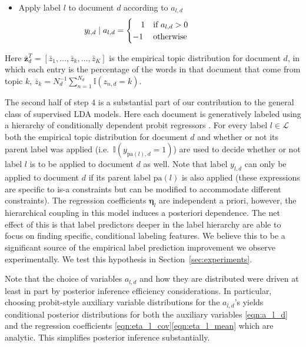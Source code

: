 \begin{enumerate}
\begin{itemize}
\begin{itemize}
\item Apply label $l$ to document $d$ according to $a_{l,d}$ \[\hspace{-2cm}
y_{l,d}\mid a_{l,d}=\begin{cases}
\ \ \ 1 & \text{if \ensuremath{a_{l,d}>0}} \\%
-1 & \text{otherwise}\end{cases}\]
 
\end{itemize}
\end{itemize}
\end{enumerate}


Here $\bar{\mathbf{z}}_d^T = [\bar{z}_{1}, \ldots, \bar{z}_k, \ldots, \bar{z}_K]$ is the empirical topic distribution for document $d$, in which each entry is the percentage of the words in that document that come from topic $k$, $\bar{z}_{k}=N_{d}^{-1}\sum_{n=1}^{N_d}\mathbb{I}(z_{n,d}=k).$ 

The second half of step 4 is a substantial part of our contribution to the general class of supervised LDA models.  Here each document is generatively labeled using a hierarchy of conditionally dependent probit regressors \cite{gelman?,probit_regression?}.  For every label $l \in \mathcal{L}$ both the empirical topic distribution for document $d$ and whether or not its parent label was applied (i.e.~$\mathbb{I}(y_{\mathrm{pa}(l),d}=1)$) are used to decide whether or not  label $l$ is to be applied to  document $d$ as well.  Note that label $y_{l,d}$ can only be applied to document $d$ if its parent label $\mathrm{pa}(l)$ is also applied (these expressions are specific to is-a constraints but can be modified to accommodate different constraints).  The regression coefficients $\boldsymbol\eta_l$ are independent a priori, however, the hierarchical coupling in this model induces a posteriori dependence.   The net effect of this is that label predictors deeper in the label hierarchy are able to focus on finding specific, conditional labeling features.  We believe this to be a significant source of the empirical label prediction improvement we observe experimentally.  We test this hypothesis in Section~\ref{sec:experiments}.

Note that the choice of variables $a_{l,d}$ and how they are distributed were  driven at least in part by posterior inference efficiency considerations.  In particular, choosing probit-style auxiliary variable distributions for the $a_{l,d}$'s  yields conditional posterior distributions for both the auxiliary variables \eqref{eqn:a_l_d} and the regression coefficients \eqref{eqn:eta_l_cov}\eqref{eqn:eta_l_mean} which are analytic.  This simplifies posterior inference substantially.

